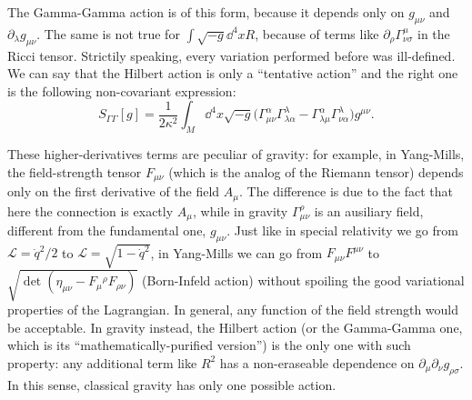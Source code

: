\documentclass[a4paper,12pt]{book}
\begin{document}
The Gamma-Gamma action is of this form, because it depends only on $g_{\mu\nu}$ and $\partial_\lambda g_{\mu\nu}$. The same is not true for $\int\sqrt{-g}\dd^4xR$, because of terms like $\partial_\rho\Gamma^\mu_{\nu\sigma}$ in the Ricci tensor. Strictily speaking, every variation performed before was ill-defined. We can say that the Hilbert action is only a ``tentative action'' and the right one is the following non-covariant expression:
\[S_{\Gamma\Gamma}[g]=\frac1{2\kappa^2}\int_M\dd^4x\sqrt{-g}\bigl(\Gamma^\alpha_{\mu\nu}\Gamma^\lambda_{\lambda\alpha}-\Gamma^\alpha_{\lambda\mu}\Gamma^\lambda_{\nu\alpha}\bigr)g^{\mu\nu}.\]

These higher-derivatives terms are peculiar of gravity: for example, in Yang-Mills, the field-strength tensor $F_{\mu\nu}$ (which is the analog of the Riemann tensor) depends only on the first derivative of the field $A_\mu$. The difference is due to the fact that here the connection is exactly $A_\mu$, while in gravity $\Gamma^\rho_{\mu\nu}$ is an ausiliary field, different from the fundamental one, $g_{\mu\nu}$. Just like in special relativity we go from $\mathcal L=\dot q^2/2$ to $\mathcal L=\sqrt{1-\dot q^2}$, in Yang-Mills we can go from $F_{\mu\nu}F^{\mu\nu}$ to $\sqrt{\det(\eta_{\mu\nu}-F_\mu{}^\rho F_{\rho\nu})}$ (Born-Infeld action) without spoiling the good variational properties of the Lagrangian. In general, any function of the field strength would be acceptable. In gravity instead, the Hilbert action (or the Gamma-Gamma one, which is its ``mathematically-purified version'') is the only one with such property: any additional term like $R^2$ has a non-eraseable dependence on $\partial_\mu\partial_\nu g_{\rho\sigma}$. In this sense, classical gravity has only one possible action.
\end{document}
